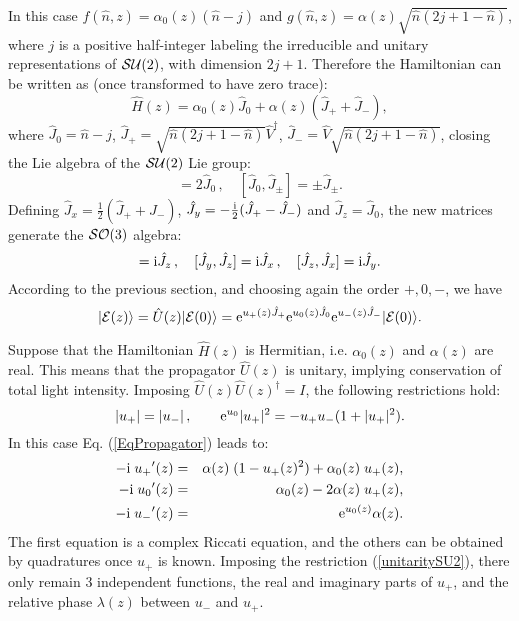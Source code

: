 \documentclass[12pt]{iopart}
\newcommand{\ket}[1]{ |#1\rangle}
\begin{document}
In this case $f(\hat{n},z)=\alpha_0(z)(\hat{n}-j)$ and
$g(\hat{n},z)=\alpha(z)\sqrt{\hat{n}(2j+1-\hat{n})}$, where $j$ is a positive
half-integer labeling the irreducible and unitary representations of ${\cal SU}(2)$, with dimension $2j+1$.
Therefore the Hamiltonian can be written as (once transformed to have zero trace):
\begin{equation}
\hat{H}(z)= \alpha_0(z) \hat{J}_0+\alpha(z)( \hat{J}_+ +\hat{J}_-),
\end{equation}
%
where %
$\hat{J}_0=\hat{n}-j$,
$\hat{J}_+=\sqrt{\hat{n}(2j+1-\hat{n})}\hat{V}^\dag$,
$\hat{J}_-=\hat{V}\sqrt{\hat{n}(2j+1-\hat{n})}$,
closing the Lie algebra of the ${\cal SU}(2)$ Lie group:
%
\begin{equation}
[\hat{J}_+,\hat{J}_-]=2\hat{J}_0\,,\quad [\hat{J}_0,\hat{J}_\pm]=\pm \hat{J}_\pm .
\end{equation}
%
Defining $\hat{J}_x=\frac{1}{2}(\hat{J}_++\hat{J}_-)$,
$\hat{J}_y=-\frac{\rm i}{2}(\hat{J}_+-\hat{J}_-)$ and $\hat{J}_z=\hat{J}_0$, the
new matrices generate the ${\cal SO}(3)$ algebra:
%
\begin{equation}
[\hat{J}_x,\hat{J}_y] = {\rm i}\hat{J}_z \,,\quad
[\hat{J}_y,\hat{J}_z] = {\rm i} \hat{J}_x \,,\quad
[\hat{J}_z,\hat{J}_x] = {\rm i}\hat{J}_y.
\end{equation}
%
%
According to the previous section, and choosing again the order  $+,0,-$, we have
%
\begin{equation}
\ket{{\cal E}(z)}=\hat{U}(z)\ket{{\cal E}(0)}
={\rm e}^{ u_+(z)\hat{J}_+}  {\rm e}^{ u_0(z)\hat{J}_0}{\rm e}^{ u_-(z)\hat{J}_-}  \ket{{\cal
		E}(0)}.
\label{SU2}
\end{equation}
%


Suppose that the Hamiltonian $\hat{H}(z)$ is Hermitian, i.e. $\alpha_0(z)$ and $\alpha(z)$ are
real.
This means that the
propagator $\hat{U}(z)$ is unitary, implying conservation of total light
intensity. Imposing $\hat{U}(z)\hat{U}(z)^\dag=I$, the following restrictions
hold:
%
\begin{equation}
|u_+|=|u_-|\,,\qquad {\rm e}^{u_0}|u_+|^2=-u_+ u_-(1+|u_+|^2).
\label{unitaritySU2}
\end{equation}
%
%
In this case Eq. (\ref{EqPropagator}) leads to:
%
\begin{eqnarray}
-{\rm i}\; {u_+}'(z)&=&\alpha(z)\; (1- u_+(z)^2)+\alpha_0(z) \; u_+(z),   \nonumber\\
-{\rm i}\; {u_0}'(z)&=&\alpha_0(z) -2 \alpha(z) \; u_+(z),  \\
-{\rm i}\; {u_-}'(z)&=& {\rm e}^{u_0(z)}\alpha(z). \nonumber
\end{eqnarray}
%
The first equation is a complex Riccati equation, and the others can be obtained by quadratures once $u_+$ is known.
Imposing the restriction (\ref{unitaritySU2}), there only remain 3 independent
functions, the real and imaginary parts
of $u_+$, and the relative phase $\lambda(z)$ between $u_-$ and $u_+$.
\end{document}

